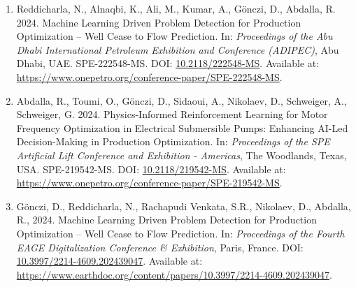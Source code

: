 \documentclass[a4paper,10pt]{article}
\begin{document}
\begin{enumerate}[leftmargin=0.5cm]
    \item Reddicharla, N., Alnaqbi, K., Ali, M., Kumar, A., Gönczi, D., Abdalla, R. 2024. Machine Learning Driven Problem Detection for Production Optimization – Well Cease to Flow Prediction. In: \textit{Proceedings of the Abu Dhabi International Petroleum Exhibition and Conference (ADIPEC)}, Abu Dhabi, UAE. SPE-222548-MS. DOI: \href{https://doi.org/10.2118/222548-MS}{10.2118/222548-MS}. Available at: \url{https://www.onepetro.org/conference-paper/SPE-222548-MS}.

    \item Abdalla, R., Toumi, O., Gönczi, D., Sidaoui, A., Nikolaev, D., Schweiger, A., Schweiger, G. 2024. Physics-Informed Reinforcement Learning for Motor Frequency Optimization in Electrical Submersible Pumps: Enhancing AI-Led Decision-Making in Production Optimization. In: \textit{Proceedings of the SPE Artificial Lift Conference and Exhibition - Americas}, The Woodlands, Texas, USA. SPE-219542-MS. DOI: \href{https://doi.org/10.2118/219542-MS}{10.2118/219542-MS}. Available at: \url{https://www.onepetro.org/conference-paper/SPE-219542-MS}.
    \item Gönczi, D., Reddicharla, N., Rachapudi Venkata, S.R., Nikolaev, D., Abdalla, R., 2024. Machine Learning Driven Problem Detection for Production Optimization – Well Cease to Flow Prediction. In: \textit{Proceedings of the Fourth EAGE Digitalization Conference \& Exhibition}, Paris, France. DOI: \href{https://doi.org/10.3997/2214-4609.202439047}{10.3997/2214-4609.202439047}. Available at: \url{https://www.earthdoc.org/content/papers/10.3997/2214-4609.202439047}.


\end{enumerate}


\vspace{3mm}

\end{document}
